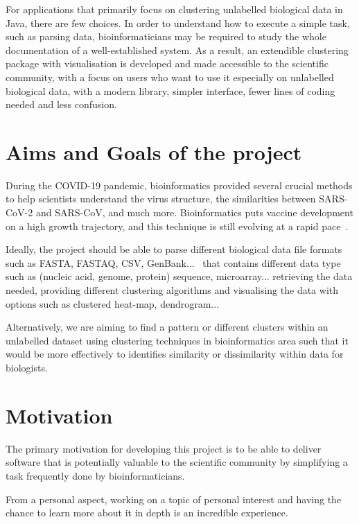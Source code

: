 \documentclass[]{final_report}
\begin{document}
For applications that primarily focus on clustering unlabelled biological data in Java, there are few choices. In order to understand how to execute a simple task, such as parsing data, bioinformaticians may be required to study the whole documentation of a well-established system. As a result, an extendible clustering package with visualisation is developed and made accessible to the scientific community, with a focus on users who want to use it especially on unlabelled biological data, with a modern library, simpler interface, fewer lines of coding needed and less confusion. 

\section{Aims and Goals of the project} \label{1.1}

During the COVID-19 pandemic, bioinformatics provided several crucial methods to help scientists understand the virus structure, the similarities between SARS-CoV-2 and SARS-CoV, and much more. Bioinformatics puts vaccine development on a high growth trajectory, and this technique is still evolving at a rapid pace~\cite{ma2021comprehensive}. 

Ideally, the project should be able to parse different biological data file formats such as FASTA, FASTAQ, CSV, GenBank...~\cite{appliedbioinfomatics2019} that contains different data type such as (nucleic acid, genome, protein) sequence, microarray... retrieving the data needed, providing different clustering algorithms and visualising the data with options such as clustered heat-map, dendrogram...

Alternatively, we are aiming to find a pattern or different clusters within an unlabelled dataset using clustering techniques in bioinformatics area such that it would be more effectively to identifies similarity or dissimilarity within data for biologists.

\section{Motivation} \label{1.3}
The primary motivation for developing this project is to be able to deliver software that is potentially valuable to the scientific community by simplifying a task frequently done by bioinformaticians.

From a personal aspect, working on a topic of personal interest and having the chance to learn more about it in depth is an incredible experience.
\end{document}
